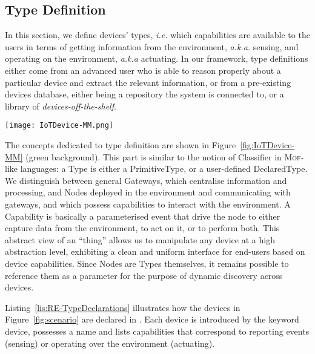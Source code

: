 \subsection{Type Definition}
\label{sec:IoTDSL-TD}

In this section, we define \IOT devices' types, \textit{i.e.} which capabilities are available to the users in terms of getting information from the environment, \textit{a.k.a.} sensing, and operating on the environment, \textit{a.k.a} actuating. In our framework, type definitions either come from an advanced user who is able to reason properly about a particular device and extract the relevant information, or from a pre-existing devices database, either being a repository the system is connected to, or a library of \textit{devices-off-the-shelf}. 

\begin{figure*}%
  \centering  
  \texttt{[image: IoTDevice-MM.png]}%
  \caption{Metamodel of \IOTDSL, separated in three concerns: \emph{Type Definition} captures devices' capabilities (top green part), \emph{Network Configuration} details how device instances are connected to each others (middle purple part), \emph{Business Rules} defines the functionalities expected from the IoT installation (bottom yellow part).}%
  \label{fig:IoTDevice-MM}%
\end{figure*}

The concepts dedicated to type definition are shown in Figure~\ref{fig:IoTDevice-MM} (green background). This part is similar to the notion of \textsf{Classifier} in \textsc{Mof}-like languages: a \textsf{Type} is either a \textsf{PrimitiveType}, or a user-defined \textsf{DeclaredType}. We distinguish between general \textsf{Gateway}s, which centralise information and processing, and \textsf{Node}s deployed in the environment and communicating with gateways, and which possess capabilities to interact with the environment. A \textsf{Capability} is basically a parameterised event that drive the node to either capture data from the environment, to act on it, or to perform both. This abstract view of an ``thing'' allows us to manipulate any device at a high abstraction level, exhibiting a clean and uniform interface for end-users based on device capabilities. Since \textsf{Node}s are \textsf{Type}s themselves, it remains possible to reference them as a parameter for the purpose of dynamic discovery across devices.

Listing~\ref{lis:RE-TypeDeclarations} illustrates how the devices in Figure~\ref{fig:scenario} are declared in \IOTDSL. Each device is introduced by the keyword \textsf{device}, possesses a name and lists capabilities that correspond to reporting events (\textsf{sensing}) or operating over the environment (\textsf{actuating}). 


